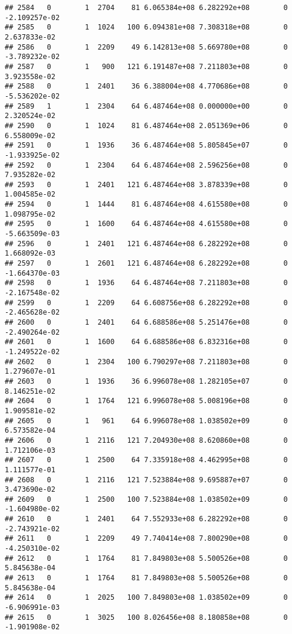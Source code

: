 \documentclass[
]{article}
\begin{document}
\begin{enumerate}
\begin{verbatim}
## 2584   0        1  2704    81 6.065384e+08 6.282292e+08        0 -2.109257e-02
## 2585   0        1  1024   100 6.094381e+08 7.308318e+08        0  2.637833e-02
## 2586   0        1  2209    49 6.142813e+08 5.669780e+08        0 -3.789232e-02
## 2587   0        1   900   121 6.191487e+08 7.211803e+08        0  3.923558e-02
## 2588   0        1  2401    36 6.388004e+08 4.770686e+08        0 -5.536202e-02
## 2589   1        1  2304    64 6.487464e+08 0.000000e+00        0  2.320524e-02
## 2590   0        1  1024    81 6.487464e+08 2.051369e+06        0  6.558009e-02
## 2591   0        1  1936    36 6.487464e+08 5.805845e+07        0 -1.933925e-02
## 2592   0        1  2304    64 6.487464e+08 2.596256e+08        0  7.935282e-02
## 2593   0        1  2401   121 6.487464e+08 3.878339e+08        0  1.004585e-02
## 2594   0        1  1444    81 6.487464e+08 4.615580e+08        0  1.098795e-02
## 2595   0        1  1600    64 6.487464e+08 4.615580e+08        0 -5.663509e-03
## 2596   0        1  2401   121 6.487464e+08 6.282292e+08        0  1.668092e-03
## 2597   0        1  2601   121 6.487464e+08 6.282292e+08        0 -1.664370e-03
## 2598   0        1  1936    64 6.487464e+08 7.211803e+08        0 -2.167548e-02
## 2599   0        1  2209    64 6.608756e+08 6.282292e+08        0 -2.465628e-02
## 2600   0        1  2401    64 6.688586e+08 5.251476e+08        0 -2.490264e-02
## 2601   0        1  1600    64 6.688586e+08 6.832316e+08        0 -1.249522e-02
## 2602   0        1  2304   100 6.790297e+08 7.211803e+08        0  1.279607e-01
## 2603   0        1  1936    36 6.996078e+08 1.282105e+07        0  8.146251e-02
## 2604   0        1  1764   121 6.996078e+08 5.008196e+08        0  1.909581e-02
## 2605   0        1   961    64 6.996078e+08 1.038502e+09        0  6.573582e-04
## 2606   0        1  2116   121 7.204930e+08 8.620860e+08        0  1.712106e-03
## 2607   0        1  2500    64 7.335918e+08 4.462995e+08        0  1.111577e-01
## 2608   0        1  2116   121 7.523884e+08 9.695887e+07        0  3.473690e-02
## 2609   0        1  2500   100 7.523884e+08 1.038502e+09        0 -1.604980e-02
## 2610   0        1  2401    64 7.552933e+08 6.282292e+08        0 -2.743921e-02
## 2611   0        1  2209    49 7.740414e+08 7.800290e+08        0 -4.250310e-02
## 2612   0        1  1764    81 7.849803e+08 5.500526e+08        0  5.845638e-04
## 2613   0        1  1764    81 7.849803e+08 5.500526e+08        0  5.845638e-04
## 2614   0        1  2025   100 7.849803e+08 1.038502e+09        0 -6.906991e-03
## 2615   0        1  3025   100 8.026456e+08 8.180858e+08        0 -1.901908e-02

\end{verbatim}
\end{enumerate}
\end{document}
